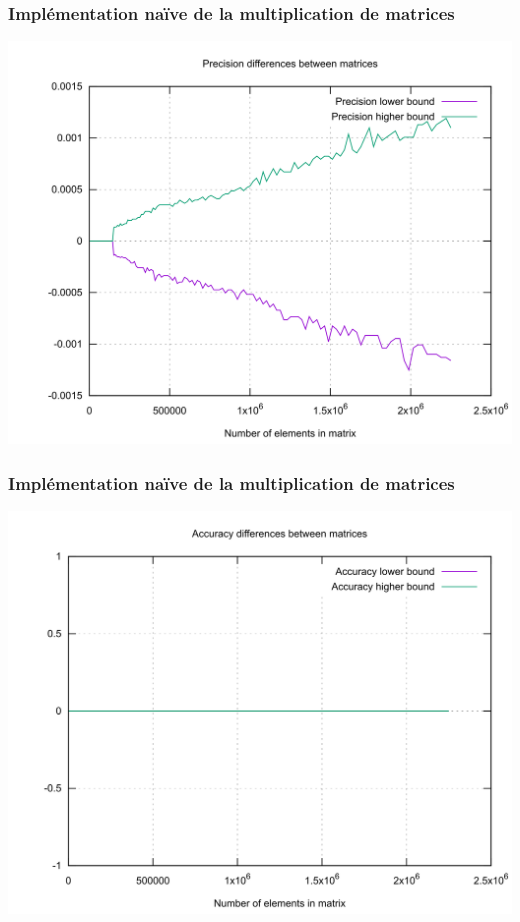 \begin{frame}
    \frametitle{Implémentation naïve de la multiplication de matrices}
    \includegraphics[width=\textwidth]{../resources/matrix_naive_float_precision.png}
\end{frame}

\begin{frame}
    \frametitle{Implémentation naïve de la multiplication de matrices}
    \includegraphics[width=\textwidth]{../resources/naive_integer_accuracy.png}
\end{frame}
